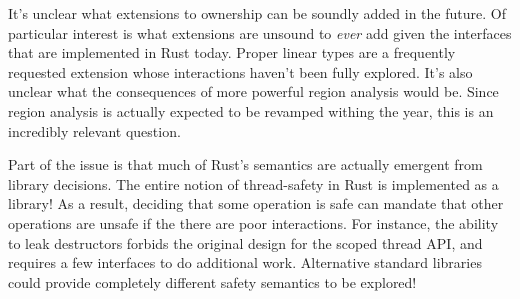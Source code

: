 It's unclear what extensions to ownership can be soundly added in the future.
Of particular interest is what extensions are unsound to \emph{ever} add given the
interfaces that are implemented in Rust today. Proper linear types are a
frequently requested extension whose interactions haven't been fully explored.
It's also unclear what the consequences of more powerful region
analysis would be. Since region analysis is actually expected to be revamped
withing the year, this is an incredibly relevant question.

Part of the issue is that much of Rust's semantics are actually emergent from
library decisions. The entire notion of thread-safety in Rust is implemented as
a library! As a result, deciding that some operation is safe can mandate that other
operations are unsafe if the there are poor interactions. For instance, the
ability to leak destructors forbids the original design for the scoped thread
API, and requires a few interfaces to do additional work. Alternative
standard libraries could provide completely different safety semantics to be
explored!
